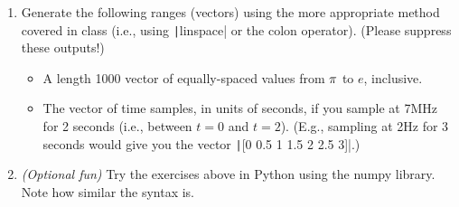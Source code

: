 \documentclass{article}
\begin{document}
\begin{enumerate}
\item Generate the following ranges (vectors) using the more appropriate method covered in class (i.e., using \texttt|linspace| or the colon operator). (Please suppress these outputs!)
  \begin{itemize}
  \item A length 1000 vector of equally-spaced values from $\-\pi$ to $e$, inclusive.
  \item The vector of time samples, in units of seconds, if you sample at 7MHz for 2 seconds (i.e., between $t=0$ and $t=2$). (E.g., sampling at 2Hz for 3 seconds would give you the vector \texttt|[0 0.5 1 1.5 2 2.5 3]|.)
  \end{itemize}
  
\item \textit{(Optional fun)} Try the exercises above in Python using the numpy library. Note how similar the syntax is.
\end{enumerate}
\end{document}
